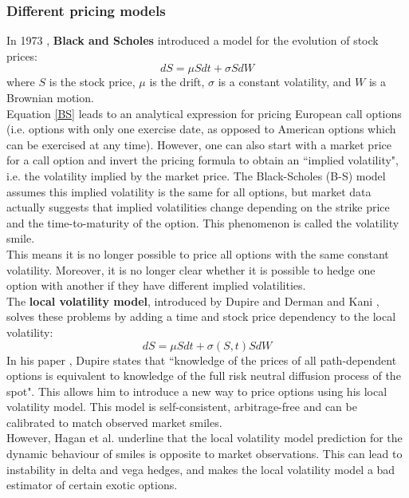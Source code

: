 \documentclass[a4paper,12pt]{article}
\begin{document}
\subsubsection{Different pricing models}
In 1973 \cite{Black1973}, \textbf{Black and Scholes} introduced a model for the evolution of stock prices:
\begin{equation}
\label{BS}
    dS = \mu S dt + \sigma S dW
\end{equation}
where $S$ is the stock price, $\mu$ is the drift, $\sigma$ is a constant volatility, and $W$ is a Brownian motion.\\
Equation \ref{BS} leads to an analytical expression for pricing European call options (i.e. options with only one exercise date, as opposed to American options which can be exercised at any time). However, one can also start with a market price for a call option and invert the pricing formula to obtain an ``implied volatility", i.e. the volatility implied by the market price. The Black-Scholes (B-S) model assumes this implied volatility is the same for all options, but market data actually suggests that implied volatilities change depending on the strike price and the time-to-maturity of the option. This phenomenon is called the volatility smile.\\
This means it is no longer possible to price all options with the same constant volatility. Moreover, it is no longer clear whether it is possible to hedge one option with another if they have different implied volatilities.\\
\newline
The \textbf{local volatility model}, introduced by Dupire \cite{Dupire1994} and Derman and Kani \cite{Derman1994}, solves these problems by adding a time and stock price dependency to the local volatility:
\begin{equation}
    dS = \mu S dt + \sigma(S,t) S dW
\end{equation}
In his paper \cite{Dupire1994}, Dupire states that ``knowledge of the prices of all path-dependent options is equivalent to knowledge of the full risk neutral diffusion process of the spot". This allows him to introduce a new way to price options using his local volatility model. This model is self-consistent, arbitrage-free and can be calibrated to match observed market smiles.\\
However, Hagan et al. \cite{Hagan2002} underline that the local volatility model prediction for the dynamic behaviour of smiles is opposite to market observations. This can lead to instability in delta and vega hedges, and makes the local volatility model a bad estimator of certain exotic options.\\
\end{document}
